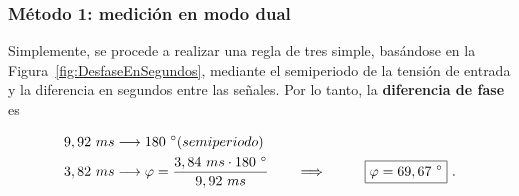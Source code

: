     \subsubsection*{Método 1: medición en modo dual}
    Simplemente, se procede a realizar una regla de tres simple, basándose en la Figura~\ref{fig:DesfaseEnSegundos}, mediante el
    semiperiodo de la tensión de entrada y la diferencia en segundos entre las señales. Por lo tanto, la \textbf{diferencia de
    fase} es

    \begin{align*}
      9,92\ ms &\longrightarrow 180\ ^{\circ} (semiperiodo) \\
      3,82\ ms &\longrightarrow \varphi = \dfrac{3,84\ ms \cdot 180\ ^{\circ}}{9,92\ ms} \hspace{20pt} \Longrightarrow \hspace{20pt} \Aboxed{\varphi=69,67\ ^{\circ}}\ .
    \end{align*}

